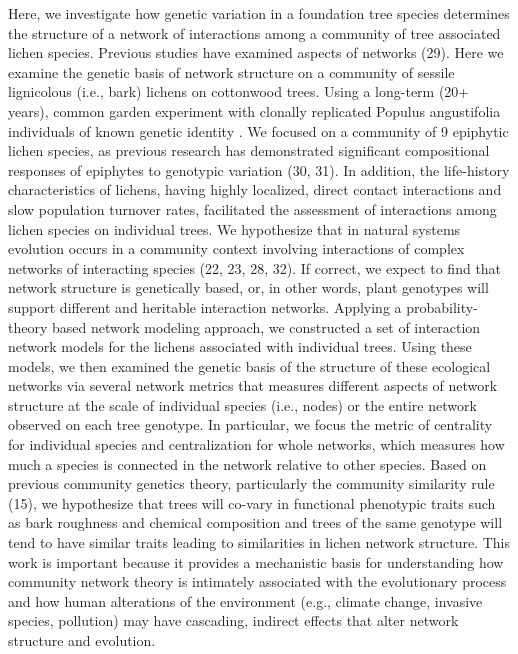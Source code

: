 \documentclass{article}
\begin{document}
Here, we investigate how genetic variation in a foundation tree
species determines the structure of a network of interactions among a
community of tree associated lichen species. Previous studies have
examined aspects of networks (29). Here we examine the genetic basis
of network structure on a community of sessile lignicolous (i.e.,
bark) lichens on cottonwood trees. Using a long-term (20+ years),
common garden experiment with clonally replicated Populus angustifolia
individuals of known genetic identity . We focused on a community of 9
epiphytic lichen species, as previous research has demonstrated
significant compositional responses of epiphytes to genotypic
variation (30, 31). In addition, the life-history characteristics of
lichens, having highly localized, direct contact interactions and slow
population turnover rates, facilitated the assessment of interactions
among lichen species on individual trees. We hypothesize that in
natural systems evolution occurs in a community context involving
interactions of complex networks of interacting species (22, 23, 28,
32). If correct, we expect to find that network structure is
genetically based, or, in other words, plant genotypes will support
different and heritable interaction networks. Applying a
probability-theory based network modeling approach, we constructed a
set of interaction network models for the lichens associated with
individual trees. Using these models, we then examined the genetic
basis of the structure of these ecological networks via several
network metrics that measures different aspects of network structure
at the scale of individual species (i.e., nodes) or the entire network
observed on each tree genotype. In particular, we focus the metric of
centrality for individual species and centralization for whole
networks, which measures how much a species is connected in the
network relative to other species. Based on previous community
genetics theory, particularly the community similarity rule (15), we
hypothesize that trees will co-vary in functional phenotypic traits
such as bark roughness and chemical composition and trees of the same
genotype will tend to have similar traits leading to similarities in
lichen network structure. This work is important because it provides a
mechanistic basis for understanding how community network theory is
intimately associated with the evolutionary process and how human
alterations of the environment (e.g., climate change, invasive
species, pollution) may have cascading, indirect effects that alter
network structure and evolution.
\end{document}
